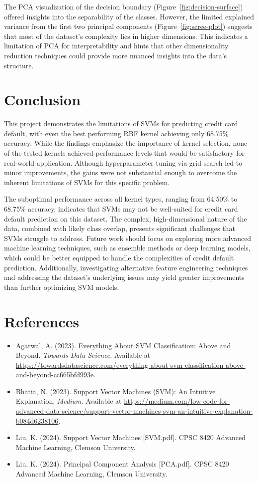 \documentclass{article}
\begin{document}
The PCA visualization of the decision boundary (Figure~\ref{fig:decision-surface}) offered insights into the separability of the classes. However, the limited explained variance from the first two principal components (Figure~\ref{fig:scree-plot}) 
suggests that most of the dataset's complexity lies in higher dimensions. This indicates a limitation of PCA for interpretability and hints that other dimensionality reduction techniques could provide more nuanced insights into the data's structure.

\section{Conclusion}

This project demonstrates the limitations of SVMs for predicting credit card default, with even the best performing RBF kernel achieving only 68.75\% accuracy. While the findings emphasize the importance of kernel selection, none of the tested kernels 
achieved performance levels that would be satisfactory for real-world application. Although hyperparameter tuning via grid search led to minor improvements, the gains were not substantial enough to overcome the inherent limitations of SVMs for this specific problem.

The suboptimal performance across all kernel types, ranging from 64.50\% to 68.75\% accuracy, indicates that SVMs may not be well-suited for credit card default prediction on this dataset. The complex, high-dimensional nature of the data, 
combined with likely class overlap, presents significant challenges that SVMs struggle to address. Future work should focus on exploring more advanced machine learning techniques, such as ensemble methods or deep learning models, which could be better equipped to 
handle the complexities of credit default prediction. Additionally, investigating alternative feature engineering techniques and addressing the dataset's underlying issues may yield greater improvements than further optimizing SVM models.


\section*{References}
\begin{itemize}
    \item Agarwal, A. (2023). Everything About SVM Classification: Above and Beyond. \textit{Towards Data Science}. Available at \url{https://towardsdatascience.com/everything-about-svm-classification-above-and-beyond-cc665bfd993e}.
    \item Bhatia, N. (2023). Support Vector Machines (SVM): An Intuitive Explanation. \textit{Medium}. Available at \url{https://medium.com/low-code-for-advanced-data-science/support-vector-machines-svm-an-intuitive-explanation-b084d6238106}.
    \item Liu, K. (2024). Support Vector Machines [SVM.pdf]. CPSC 8420 Advanced Machine Learning, Clemson University.
    \item Liu, K. (2024). Principal Component Analysis [PCA.pdf]. CPSC 8420 Advanced Machine Learning, Clemson University.
\end{itemize}
\end{document}
